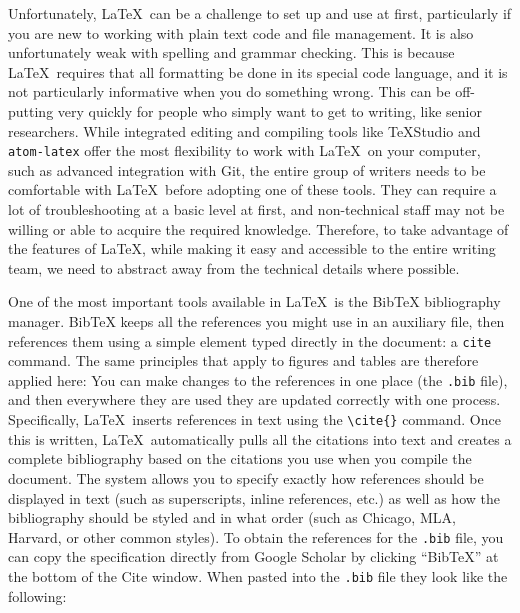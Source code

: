 Unfortunately, \LaTeX\ can be a challenge to set up and use at first,
particularly if you are new to working with plain text code and file management.
It is also unfortunately weak with spelling and grammar checking.
This is because \LaTeX\ requires that all formatting be done in its special code language,
and it is not particularly informative when you do something wrong.
This can be off-putting very quickly for people
who simply want to get to writing, like senior researchers.
While integrated editing and compiling tools like TeXStudio
and \texttt{atom-latex}
offer the most flexibility to work with \LaTeX\ on your computer,
such as advanced integration with Git,
the entire group of writers needs to be comfortable
with \LaTeX\ before adopting one of these tools.
They can require a lot of troubleshooting at a basic level at first,
and non-technical staff may not be willing or able to acquire the required knowledge.
Therefore, to take advantage of the features of \LaTeX,
while making it easy and accessible to the entire writing team,
we need to abstract away from the technical details where possible.

One of the most important tools available in \LaTeX\ is the BibTeX bibliography manager.
BibTeX keeps all the references you might use in an auxiliary file,
then references them using a simple element typed directly in the document: a \texttt{cite} command.
The same principles that apply to figures and tables are therefore applied here:
You can make changes to the references in one place (the \texttt{.bib} file),
and then everywhere they are used they are updated correctly with one process.
Specifically, \LaTeX\ inserts references in text using the \texttt{\textbackslash cite\{\}} command.
Once this is written, \LaTeX\ automatically pulls all the citations into text
and creates a complete bibliography based on the citations you use when you compile the document.
The system allows you to specify exactly how references should be displayed in text
(such as superscripts, inline references, etc.)
as well as how the bibliography should be styled and in what order
(such as Chicago, MLA, Harvard, or other common styles).
To obtain the references for the \texttt{.bib} file,
you can copy the specification directly from Google Scholar
by clicking ``BibTeX'' at the bottom of the Cite window.
When pasted into the \texttt{.bib} file they look like the following:

